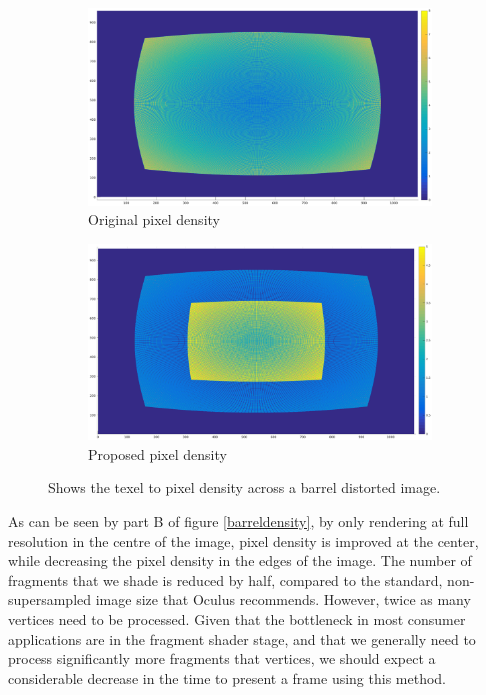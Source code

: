 \documentclass[12pt,a4paper,twoside,openright]{report}
\begin{document}
\begin{figure}[tbh]

\begin{subfigure}{0.5\textwidth}
\includegraphics[width=1.2\linewidth]{figs/oculus_pixel_density.eps}
\caption{Original pixel density}
\label{epsfig1}
\end{subfigure}
\begin{subfigure}{0.5\textwidth}
\includegraphics[width=1.2\linewidth]{figs/oculus_pixel_density_optimisation.eps}
\caption{Proposed pixel density}
\label{epsfig1}
\end{subfigure}
 
\caption{Shows the texel to pixel density across a barrel distorted image.}
\label{fig:barreldensity}
\end{figure}

\begin{figure}
\end{figure}

As can be seen by part B of figure \ref{barreldensity}, by only rendering at full resolution in the centre of the image, pixel density is improved at the center, while decreasing the pixel density in the edges of the image. The number of fragments that we shade is reduced by half, compared to the standard, non-supersampled image size that Oculus recommends. However, twice as many vertices need to be processed. Given that the bottleneck in most consumer applications are in the fragment shader stage, and that we generally need to process significantly more fragments that vertices, we should expect a considerable decrease in the time to present a frame using this method. 
\end{document}
